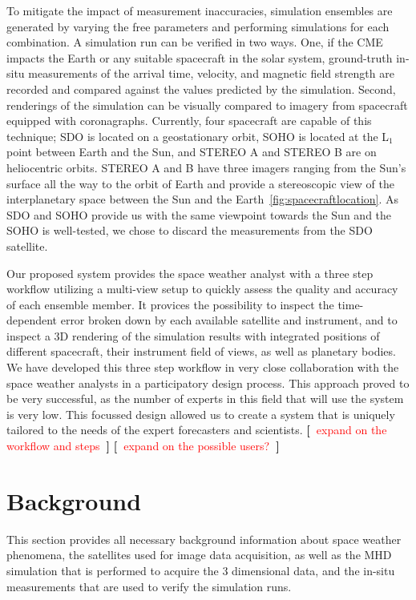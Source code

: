 \documentclass[journal]{vgtc}                %
\newcommand{\todo}[1] {\textbf{[~}\textcolor {red}{#1}\marginpar{\textcolor {red}{\centerline{{\Huge \textbf{!}}}}}\textbf{~]}}
\newcommand{\todo}[1] {\textbf{[~}\textcolor {red}{#1}\marginpar{\textcolor {red}{\centerline{{\Huge \textbf{!}}}}}\textbf{~]}}
\begin{document}
To mitigate the impact of measurement inaccuracies, simulation ensembles are generated by varying the free parameters and performing simulations for each combination. A simulation run can be verified in two ways. One, if the CME impacts the Earth or any suitable spacecraft in the solar system, ground-truth in-situ measurements of the arrival time, velocity, and magnetic field strength are recorded and compared against the values predicted by the simulation. Second, renderings of the simulation can be visually compared to imagery from spacecraft equipped with coronagraphs. Currently, four spacecraft are capable of this technique; SDO is located on a geostationary orbit, SOHO is located at the L$_1$ point between Earth and the Sun, and STEREO A and STEREO B are on heliocentric orbits. STEREO A and B have three imagers ranging from the Sun's surface all the way to the orbit of Earth and provide a stereoscopic view of the interplanetary space between the Sun and the Earth~\ref{fig:spacecraftlocation}. As SDO and SOHO provide us with the same viewpoint towards the Sun and the SOHO is well-tested, we chose to discard the measurements from the SDO satellite.

Our proposed system provides the space weather analyst with a three step workflow utilizing a multi-view setup to quickly assess the quality and accuracy of each ensemble member. It provices the possibility to inspect the time-dependent error broken down by each available satellite and instrument, and to inspect a 3D rendering of the simulation results with integrated positions of different spacecraft, their instrument field of views, as well as planetary bodies. We have developed this three step workflow in very close collaboration with the space weather analysts in a participatory design process. This approach proved to be very successful, as the number of experts in this field that will use the system is very low. This focussed design allowed us to create a system that is uniquely tailored to the needs of the expert forecasters and scientists. \todo{expand on the workflow and steps} \todo{expand on the possible users?}

\section{Background}
This section provides all necessary background information about space weather phenomena, the satellites used for image data acquisition, as well as the MHD simulation that is performed to acquire the 3 dimensional data, and the in-situ measurements that are used to verify the simulation runs.
\end{document}
